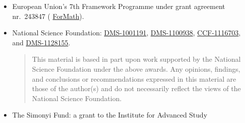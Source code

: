 {\begin{itemize}
\item European Union's 7th Framework Programme under grant agreement nr.\ 243847 (%
\href{http://wiki.portal.chalmers.se/cse/pmwiki.php/ForMath/ForMath/}{ForMath}). %

\item National Science Foundation:
  \href{http://www.nsf.gov/awardsearch/showAward.do?AwardNumber=1001191}{DMS-1001191}, %
  \href{http://www.nsf.gov/awardsearch/showAward.do?AwardNumber=1100938}{DMS-1100938}, %
  \href{http://www.nsf.gov/awardsearch/showAward.do?AwardNumber=1116703}{CCF-1116703}, %
  and 
  \href{http://www.nsf.gov/awardsearch/showAward.do?AwardNumber=1128155}{DMS-1128155}. %
  {
    \setlength{\itemsep}{0pt}
    \begin{quote}
      \noindent\scriptsize
      This material is based in part upon work supported by the
      National Science Foundation under the above awards.  Any opinions,
      findings, and conclusions or recommendations expressed in this
      material are those of the author(s) and do not necessarily reflect the
      views of the National Science Foundation.
    \end{quote}
  }
\item The Simonyi Fund: a grant to the Institute for Advanced Study          %
  \end{itemize}


}
\cleartooddpage

